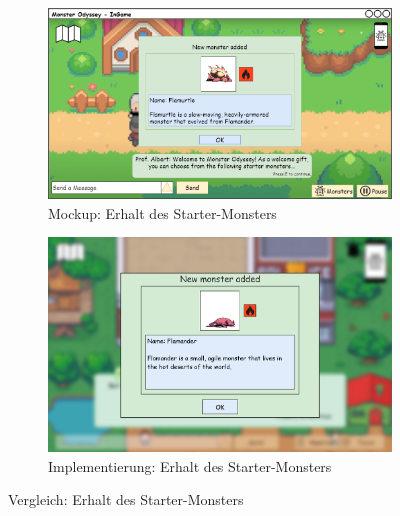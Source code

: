 \begin{figure}[H]
    \centering
    \begin{subfigure}[b]{0.4\textwidth}
        \includegraphics[width=\textwidth]{images/mockups/Starter/PlayerAndProfMonsterReceived}
        \caption{Mockup: Erhalt des Starter-Monsters}
        \label{fig: Mockup: Erhaltener Starter-Monster}
    \end{subfigure}
    \hfill
    \begin{subfigure}[b]{0.4\textwidth}
        \includegraphics[width=\textwidth]{images/implementation/Starter/New Monster added implementation.png}
        \caption{Implementierung: Erhalt des Starter-Monsters}
        \label{fig: Implementierung: Erhaltener Starter-Monster}
    \end{subfigure}
    \caption{Vergleich: Erhalt des Starter-Monsters}
    \label{fig: Vergleich: Erhaltener Starter-Monster}
\end{figure}